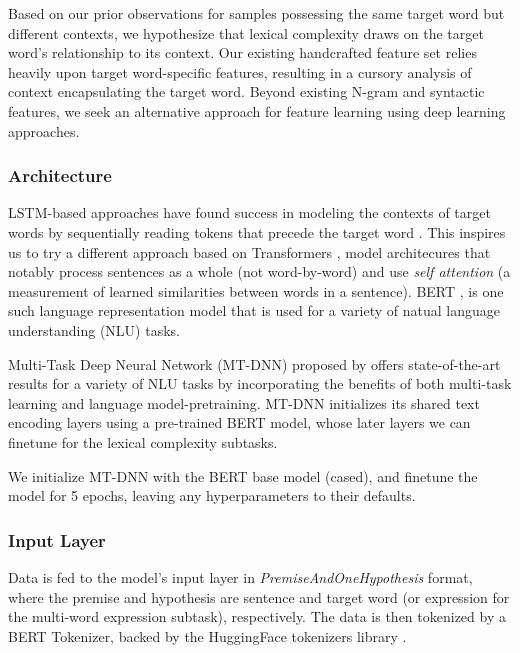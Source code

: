 \documentclass[11pt,a4paper]{article}
\begin{document}
Based on our prior observations for samples possessing the same target word but different contexts, we hypothesize that lexical complexity draws on the target word's relationship to its context. Our existing handcrafted feature set relies heavily upon target word-specific features, resulting in a cursory analysis of context encapsulating the target word. Beyond existing N-gram and syntactic features, we seek an alternative approach for feature learning using deep learning approaches.

\subsubsection{Architecture}

LSTM-based approaches have found success in modeling the contexts of target words by sequentially reading tokens that precede the target word \citep{hartmanndossantos2018nilc}. This inspires us to try a different approach based on Transformers \citep{DBLP:journals/corr/VaswaniSPUJGKP17}, model architecures that notably process sentences as a whole (not word-by-word) and use \textit{self attention} (a measurement of learned similarities between words in a sentence). BERT \citep{DBLP:journals/corr/abs-1810-04805}, is one such language representation model that is used for a variety of natual language understanding (NLU) tasks.

Multi-Task Deep Neural Network (MT-DNN) proposed by \citet{liuetal2019multitask} offers state-of-the-art results for a variety of NLU tasks by incorporating the benefits of both multi-task learning and language model-pretraining. MT-DNN initializes its shared text encoding layers using a pre-trained BERT model, whose later layers we can finetune for the lexical complexity subtasks. 

We initialize MT-DNN with the BERT base model (cased), and finetune the model for 5 epochs, leaving any hyperparameters to their defaults.

\subsubsection{Input Layer}

Data is fed to the model's input layer in \textit{PremiseAndOneHypothesis} format, where the premise and hypothesis are sentence and target word (or expression for the multi-word expression subtask), respectively. The data is then tokenized by a BERT Tokenizer, backed by the HuggingFace tokenizers library \citep{wolf_etal_2020_transformers}.
\end{document}
